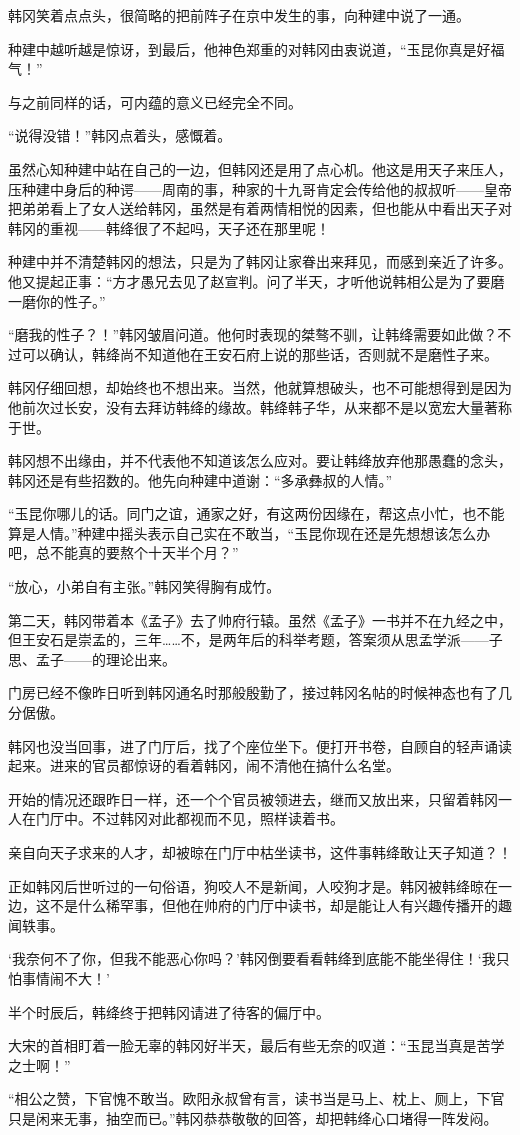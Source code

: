 韩冈笑着点点头，很简略的把前阵子在京中发生的事，向种建中说了一通。

种建中越听越是惊讶，到最后，他神色郑重的对韩冈由衷说道，“玉昆你真是好福气！”

与之前同样的话，可内蕴的意义已经完全不同。

“说得没错！”韩冈点着头，感慨着。

虽然心知种建中站在自己的一边，但韩冈还是用了点心机。他这是用天子来压人，压种建中身后的种谔——周南的事，种家的十九哥肯定会传给他的叔叔听——皇帝把弟弟看上了女人送给韩冈，虽然是有着两情相悦的因素，但也能从中看出天子对韩冈的重视——韩绛很了不起吗，天子还在那里呢！

种建中并不清楚韩冈的想法，只是为了韩冈让家眷出来拜见，而感到亲近了许多。他又提起正事：“方才愚兄去见了赵宣判。问了半天，才听他说韩相公是为了要磨一磨你的性子。”

“磨我的性子？！”韩冈皱眉问道。他何时表现的桀骜不驯，让韩绛需要如此做？不过可以确认，韩绛尚不知道他在王安石府上说的那些话，否则就不是磨性子来。

韩冈仔细回想，却始终也不想出来。当然，他就算想破头，也不可能想得到是因为他前次过长安，没有去拜访韩绛的缘故。韩绛韩子华，从来都不是以宽宏大量著称于世。

韩冈想不出缘由，并不代表他不知道该怎么应对。要让韩绛放弃他那愚蠢的念头，韩冈还是有些招数的。他先向种建中道谢：“多承彝叔的人情。”

“玉昆你哪儿的话。同门之谊，通家之好，有这两份因缘在，帮这点小忙，也不能算是人情。”种建中摇头表示自己实在不敢当，“玉昆你现在还是先想想该怎么办吧，总不能真的要熬个十天半个月？”

“放心，小弟自有主张。”韩冈笑得胸有成竹。

第二天，韩冈带着本《孟子》去了帅府行辕。虽然《孟子》一书并不在九经之中，但王安石是崇孟的，三年……不，是两年后的科举考题，答案须从思孟学派——子思、孟子——的理论出来。

门房已经不像昨日听到韩冈通名时那般殷勤了，接过韩冈名帖的时候神态也有了几分倨傲。

韩冈也没当回事，进了门厅后，找了个座位坐下。便打开书卷，自顾自的轻声诵读起来。进来的官员都惊讶的看着韩冈，闹不清他在搞什么名堂。

开始的情况还跟昨日一样，还一个个官员被领进去，继而又放出来，只留着韩冈一人在门厅中。不过韩冈对此都视而不见，照样读着书。

亲自向天子求来的人才，却被晾在门厅中枯坐读书，这件事韩绛敢让天子知道？！

正如韩冈后世听过的一句俗语，狗咬人不是新闻，人咬狗才是。韩冈被韩绛晾在一边，这不是什么稀罕事，但他在帅府的门厅中读书，却是能让人有兴趣传播开的趣闻轶事。

‘我奈何不了你，但我不能恶心你吗？’韩冈倒要看看韩绛到底能不能坐得住！‘我只怕事情闹不大！’

半个时辰后，韩绛终于把韩冈请进了待客的偏厅中。

大宋的首相盯着一脸无辜的韩冈好半天，最后有些无奈的叹道：“玉昆当真是苦学之士啊！”

“相公之赞，下官愧不敢当。欧阳永叔曾有言，读书当是马上、枕上、厕上，下官只是闲来无事，抽空而已。”韩冈恭恭敬敬的回答，却把韩绛心口堵得一阵发闷。

